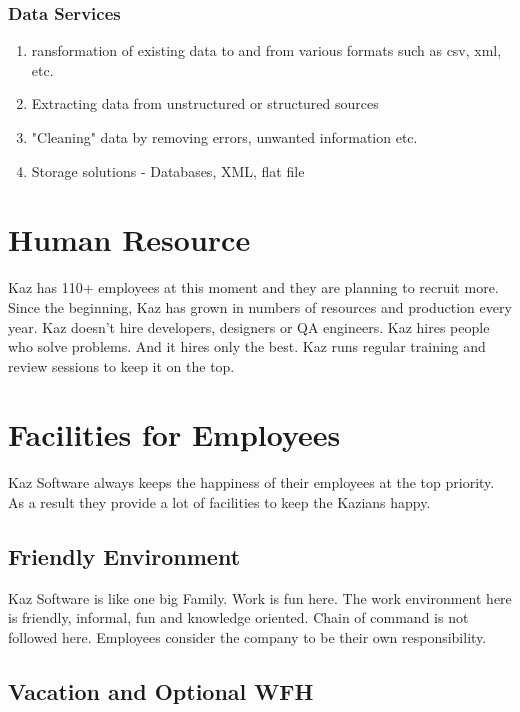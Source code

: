 \subsubsection*{Data Services}

\begin{enumerate}
    \item ransformation of existing data to and from various formats such as csv, xml, etc.
    \item Extracting data from unstructured or structured sources
    \item "Cleaning" data by removing errors, unwanted information etc.
    \item Storage solutions - Databases, XML, flat file
\end{enumerate}

\section{Human Resource}

Kaz has 110+ employees at this moment and they are planning to recruit more.
Since the beginning, Kaz has grown in numbers of resources and production every year.
Kaz doesn't hire developers, designers or QA engineers.
Kaz hires people who solve problems.
And it hires only the best.
Kaz runs regular training and review sessions to keep it on the top.

\section{Facilities for Employees}

Kaz Software always keeps the happiness of their employees at the top priority.
As a result they provide a lot of facilities to keep the Kazians happy.

\subsection{Friendly Environment}

Kaz Software is like one big Family.
Work is fun here.
The work environment here is friendly, informal, fun and knowledge oriented.
Chain of command is not followed here.
Employees consider the company to be their own responsibility.

\subsection{Vacation and Optional WFH}

